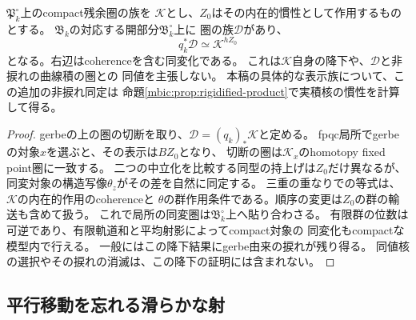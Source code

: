 \begin{corollary}[中心同変化の因子モジュライへの降下]
\label{mbfm:cor:equivariant-rigidification}
$\mathfrak P_k^\circ$上のcompact残余圏の族を
$\mathscr K$とし、$Z_0$はその内在的慣性として作用するものとする。
$\mathfrak B_k$の対応する開部分$\mathfrak B_k^\circ$上に
圏の族$\mathscr D$があり、
\[
 q_k^*\mathscr D\simeq\mathscr K^{hZ_0}
\]
となる。右辺はcoherenceを含む同変化である。
これは$\mathscr K$自身の降下や、$\mathscr D$と非捩れの曲線積の圏との
同値を主張しない。
本稿の具体的な表示族について、この追加の非捩れ同定は
命題\ref{mbic:prop:rigidified-product}で実積核の慣性を計算して得る。
\end{corollary}
\begin{proof}
gerbeの上の圏の切断を取り、$\mathscr D=(q_k)_*\mathscr K$と定める。
fpqc局所でgerbeの対象$x$を選ぶと、その表示は$BZ_0$となり、
切断の圏は$\mathscr K_x$のhomotopy fixed point圏に一致する。
二つの中立化を比較する同型の持上げは$Z_0$だけ異なるが、
同変対象の構造写像$\theta_z$がその差を自然に同定する。
三重の重なりでの等式は、$\mathscr K$の内在的作用のcoherenceと
$\theta$の群作用条件である。順序の変更は$Z_0$の群の輸送も含めて扱う。
これで局所の同変圏は$\mathfrak B_k^\circ$上へ貼り合わさる。
有限群の位数は可逆であり、有限軌道和と平均射影によってcompact対象の
同変化もcompactな模型内で行える。
一般にはこの降下結果にgerbe由来の捩れが残り得る。
同値核の選択やその捩れの消滅は、この降下の証明には含まれない。
\end{proof}

\subsection{平行移動を忘れる滑らかな射}

